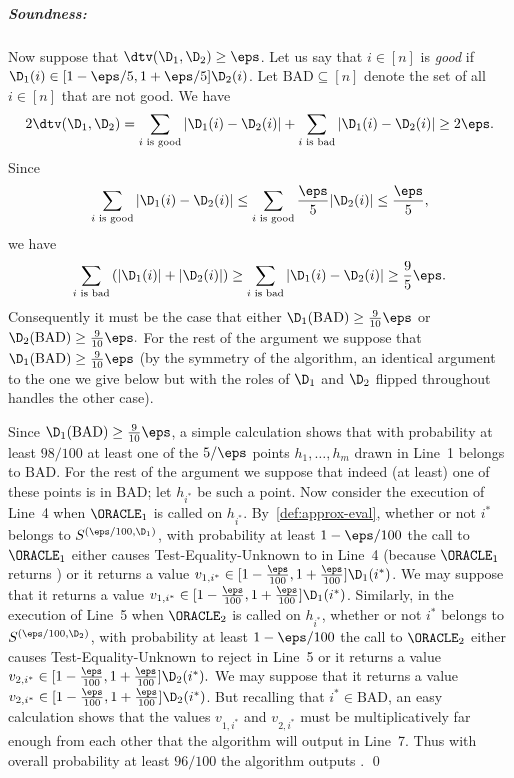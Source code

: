 \medskip

\subparagraph{Soundness:}
Now suppose that $\dtv(\D_1,\D_2) \geq \eps$.
Let us say that $i \in [n]$ is \emph{good} if
$\D_1(i) \in [1 - \eps/5,1+\eps/5]\D_2(i)$.  Let $\textrm{BAD} \subseteq [n]$
denote the set of all $i \in [n]$ that are not good.
We have
\[
2\dtv(\D_1,\D_2) =
\sum_{i \text{~is good}}|\D_1(i)-\D_2(i)|
+ \sum_{i \text{~is bad}}|\D_1(i)-\D_2(i)| \geq 2 \eps.
\]
Since
\[
\sum_{i \text{~is good}}|\D_1(i)-\D_2(i)| \leq
\sum_{i \text{~is good}} {\frac{\eps}5} |\D_2(i)| \leq
{\frac{\eps}5},
\]
we have
\[
\sum_{i \text{~is bad}}\left(|\D_1(i)| + |\D_2(i)|\right) \geq
\sum_{i \text{~is bad}}|\D_1(i)-\D_2(i)|
\geq {\frac 9 5}\eps.
\]
Consequently it must be the case that either
$
\D_1(\textrm{BAD}) \geq {\frac 9 {10}}\eps$ or
$
\D_2(\textrm{BAD}) \geq {\frac 9 {10}}\eps.$  For the rest
of the argument we suppose that
$\D_1(\textrm{BAD}) \geq {\frac 9 {10}}\eps$
(by the symmetry of the algorithm, an identical argument to the
one we give below but with the roles of $\D_1$ and $\D_2$ flipped throughout
handles the other case).

Since $\D_1(\textrm{BAD}) \geq {\frac 9 {10}}\eps$, a simple calculation shows that
with probability at least $98/100$ at least one of the $5/\eps$ points
$h_1,\dots,h_{m}$ drawn in Line~1 belongs to $\textrm{BAD}$.
For the rest
of the argument we suppose that indeed (at least) one of these points
is in $\textrm{BAD}$; let $h_{i^\ast}$ be such a point.
Now consider the execution of Line~4 when $\ORACLE_1$ is called
on $h_{i^\ast}.$  By~\cref{def:approx-eval}, whether
or not $i^\ast$ belongs to $S^{(\eps/100,\D_1)}$, with probability
at least $1 - \eps/100$ the call to $\ORACLE_1$ either causes
{\sc Test-Equality-Unknown} to \reject in Line~4 (because $\ORACLE_1$
returns \unknown) or it returns a value $v_{1,i^\ast} \in
[1-{\frac{\eps}{100}},1+ {\frac{\eps}{100}}]\D_1(i^\ast)$.   We
may suppose that it returns a value $v_{1,i^\ast} \in
[1-{\frac{\eps}{100}},1+ {\frac{\eps}{100}}]\D_1(i^\ast)$.
Similarly, in the execution of Line~5 when $\ORACLE_2$ is called on
$h_{i^\ast}$, whether or not $i^\ast$ belongs to $S^{(\eps/100,\D_2)}$,
with probability at least $1-\eps/100$ the call to $\ORACLE_2$ either
causes {\sc Test-Equality-Unknown} to reject in Line~5 or it returns
a value $v_{2,i^\ast} \in [1-{\frac{\eps}{100}},1+{\frac{\eps}{100}}]
\D_2(i^\ast).$  We may suppose that it returns a
value $v_{2,i^\ast} \in
[1-{\frac{\eps}{100}},1+ {\frac{\eps}{100}}]\D_2(i^\ast)$.
But recalling that $i^\ast \in \textrm{BAD}$, an easy calculation shows that
the values $v_{1,i^\ast}$ and $v_{2,i^\ast}$ must be
multiplicatively far enough from each other that
the algorithm will output \reject in Line~7.  Thus with
overall probability at least $96/100$ the algorithm outputs
\reject.
\qed
 

